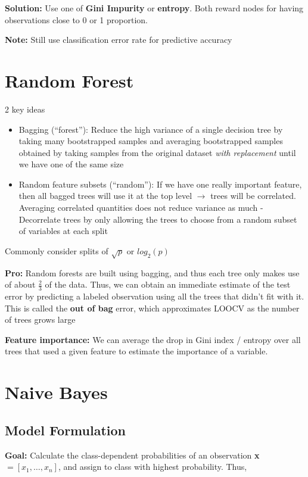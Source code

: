 \documentclass{article}
\begin{document}
\textbf{Solution:} Use one of \textbf{Gini Impurity} or \textbf{entropy}. Both reward nodes for having observations close to 0 or 1 proportion.

\textbf{Note:} Still use classification error rate for predictive accuracy


\section{Random Forest}
2 key ideas
\begin{itemize}
	\item Bagging (``forest''): Reduce the high variance of a single decision tree by taking many bootstrapped samples and averaging bootstrapped samples obtained by taking samples 	from the original dataset \textit{with replacement} until we have one of the same size
	\item Random feature subsets (``random''): If we have one really important feature, then all bagged trees will use it at the top level $\rightarrow$ trees will be correlated. Averaging correlated 		quantities does not reduce variance as much
		- Decorrelate trees by only allowing the trees to choose from a random subset of variables at each split
\end{itemize}

Commonly consider splits of $\sqrt{p}$ or $log_2(p)$

\textbf{Pro:} Random forests are built using bagging, and thus each tree only makes use of about $\frac23$ of the data. Thus, we can obtain an immediate estimate of the test error by predicting a labeled observation using all the trees that didn't fit with it. This is called the \textbf{out of bag} error, which approximates LOOCV as the number of trees grows large

\textbf{Feature importance:} We can average the drop in Gini index / entropy over all trees that used a given feature to estimate the importance of a variable. 

\section{Naive Bayes}

\subsection{Model Formulation}

\textbf{Goal:} Calculate the class-dependent probabilities of an observation \textbf{x} $= [x_1, \ldots, x_n]$, and assign to class with highest probability. Thus,
\end{document}
